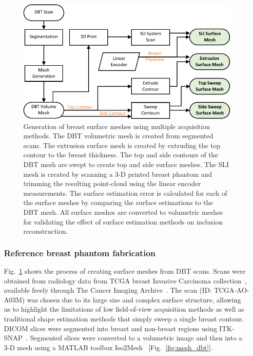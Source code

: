 \begin{figure}
    \begin{center}
    \includegraphics[width=.9\textwidth]{fig/omci/mesh_flowchart2.pdf}
    \end{center}
    \caption{Generation of breast surface meshes using multiple acquisition methods. The \ac{DBT} volumetric mesh is created from segmented scans. The extrusion surface mesh is created by extruding the top contour to the breast thickness. The top and side contours of the \ac{DBT} mesh are swept to create top and side surface meshes. The \ac{SLI} mesh is created by scanning a 3-D printed breast phantom and trimming the resulting point-cloud using the linear encoder measurements. The surface estimation error is calculated for each of the surface meshes by comparing the surface estimations to the \ac{DBT} mesh. All surface meshes are converted to volumetric meshes for validating the effect of surface estimation methods on inclusion reconstruction.}
    \label{fig:mesh_flowchart}
\end{figure} 

\subsubsection{Reference breast phantom fabrication}
Fig.~\ref{fig:mesh_flowchart} shows the process of creating surface meshes from \ac{DBT} scans. Scans were obtained from radiology data from \ac{TCGA} breast Invasive Carcinoma collection~\cite{Lingle2016}, available freely through The Cancer Imaging Archive~\cite{Clark2013}. The scan (ID: TCGA-AO-A03M) was chosen due to its large size and complex surface structure, allowing us to highlight the limitations of low field-of-view acquisition methods as well as traditional shape estimation methods that simply sweep a single breast contour. \ac{DICOM} slices were segmented into breast and non-breast regions using ITK-SNAP~\cite{Yushkevich2006}. Segmented slices were converted to a volumetric image and then into a 3-D mesh using a MATLAB toolbox Iso2Mesh~\cite{Fang2009} [Fig.~\ref{fig:mesh_dbt}].

